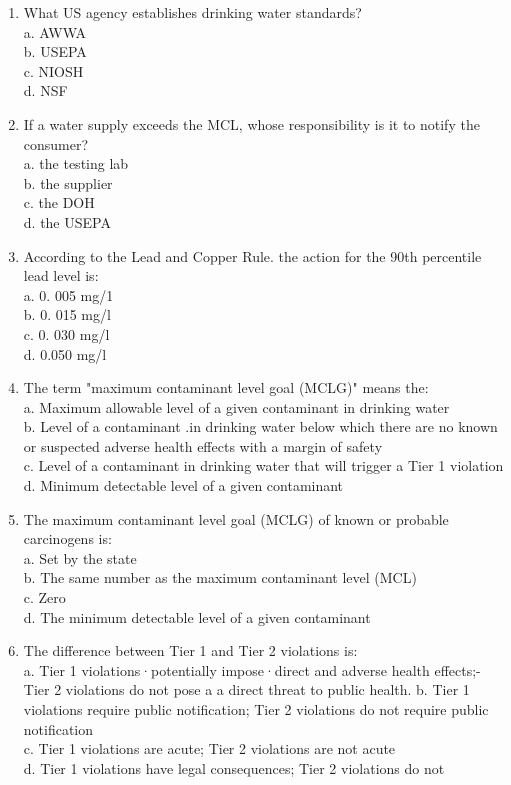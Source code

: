 \begin{enumerate}
\item What US agency establishes drinking water standards?\\
a.	AWWA\\
b.	USEPA\\
c.	NIOSH\\
d.	NSF\\

\item If a water supply exceeds the MCL, whose responsibility is it to notify the consumer?\\
a.	the testing lab\\
b. 	the supplier\\
c.	the DOH\\
d.	the USEPA\\

\item According to the Lead and Copper Rule. the action for the 90th percentile lead level is:\\
a.	0. 005 mg/1\\
b.	0. 015 mg/l\\
c.	0. 030 mg/l\\
d.	0.050 mg/l\\


\item The term "maximum contaminant level goal (MCLG)" means the:\\ 
a. Maximum allowable level of a given contaminant in drinking water\\
b. Level of a contaminant .in drinking water below which there are no known or suspected adverse health effects with a margin of safety\\
c. Level of a contaminant in drinking water that will trigger a Tier 1 violation\\
d. Minimum detectable level of a given contaminant\\

\item The maximum contaminant level goal (MCLG) of known or probable carcinogens is:\\
a. Set by the state\\
b. The same number as the maximum contaminant level (MCL)\\
c. Zero\\
d. The minimum detectable level of a given contaminant\\

\item The difference between Tier 1 and Tier 2 violations is:\\
a. Tier 1 violations·potentially impose·direct and adverse health effects;-Tier 2 violations do not pose a a direct threat to public health.
b. Tier 1 violations require public notification; Tier 2 violations do not require public notification\\
c. Tier 1 violations are acute; Tier 2 violations are not acute\\
d. Tier 1 violations have legal consequences; Tier 2 violations do not\\


\end{enumerate}
